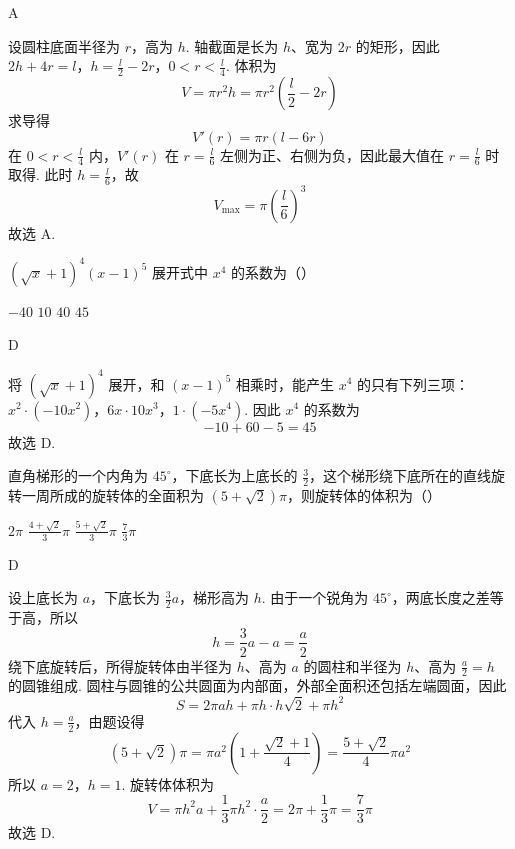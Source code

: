 \documentclass[UTF8,a4paper,oneside,11pt]{ctexbook}
\begin{document}
\begin{answer}
A
\end{answer}

\begin{solution}
设圆柱底面半径为 \(r\)，高为 \(h\). 轴截面是长为 \(h\)、宽为 \(2r\) 的矩形，因此
\(2h+4r=l\)，\(h=\frac l2-2r\)，\(0<r<\frac l4\).
体积为
\[
V=\pi r^2h=\pi r^2\left(\frac l2-2r\right)
\]
求导得
\[
V'(r)=\pi r(l-6r)
\]
在 \(0<r<\frac l4\) 内，\(V'(r)\) 在 \(r=\frac l6\) 左侧为正、右侧为负，因此最大值在 \(r=\frac l6\) 时取得. 此时 \(h=\frac l6\)，故
\[
V_{\max}=\pi\left(\frac l6\right)^3
\]
故选 A.
\end{solution}

\begin{problem}
\((\sqrt{x}+1)^4(x-1)^5\) 展开式中 \(x^4\) 的系数为（\quad）

\choices
    {\(-40\)}
    {\(10\)}
    {\(40\)}
    {\(45\)}
\end{problem}

\begin{answer}
D
\end{answer}

\begin{solution}
将 \((\sqrt{x}+1)^4\) 展开，和 \((x-1)^5\) 相乘时，能产生 \(x^4\) 的只有下列三项：
\(x^2\cdot(-10x^2)\)，\(6x\cdot10x^3\)，\(1\cdot(-5x^4)\).
因此 \(x^4\) 的系数为
\[
-10+60-5=45
\]
故选 D.
\end{solution}

\begin{problem}
直角梯形的一个内角为 \(45^\circ\)，下底长为上底长的 \(\frac{3}{2}\)，这个梯形绕下底所在的直线旋转一周所成的旋转体的全面积为 \(\left(5+\sqrt{2}\right)\pi\)，则旋转体的体积为（\quad）

\choices
    {\(2\pi\)}
    {\(\frac{4+\sqrt{2}}{3}\pi\)}
    {\(\frac{5+\sqrt{2}}{3}\pi\)}
    {\(\frac{7}{3}\pi\)}
\end{problem}

\begin{answer}
D
\end{answer}

\begin{solution}
设上底长为 \(a\)，下底长为 \(\frac32a\)，梯形高为 \(h\). 由于一个锐角为 \(45^\circ\)，两底长度之差等于高，所以
\[
h=\frac32a-a=\frac a2
\]
绕下底旋转后，所得旋转体由半径为 \(h\)、高为 \(a\) 的圆柱和半径为 \(h\)、高为 \(\frac a2=h\) 的圆锥组成. 圆柱与圆锥的公共圆面为内部面，外部全面积还包括左端圆面，因此
\[
S=2\pi ah+\pi h\cdot h\sqrt2+\pi h^2
\]
代入 \(h=\frac a2\)，由题设得
\[
(5+\sqrt2)\pi
=\pi a^2\left(1+\frac{\sqrt2+1}{4}\right)
=\frac{5+\sqrt2}{4}\pi a^2
\]
所以 \(a=2\)，\(h=1\). 旋转体体积为
\[
V=\pi h^2a+\frac13\pi h^2\cdot\frac a2
=2\pi+\frac13\pi=\frac73\pi
\]
故选 D.
\end{solution}
\end{document}
